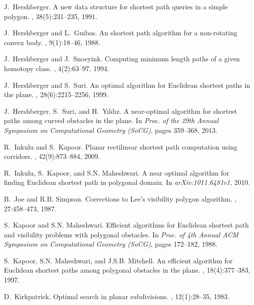 \documentclass[english,runningheads,11pt]{llncs}
\begin{document}
\begin{thebibliography}{10}
J.~Hershberger.
\newblock A new data structure for shortest path queries in a simple polygon.
, 38(5):231--235, 1991.

J.~Hershberger and L.~Guibas.
\newblock An {} shortest path algorithm for a non-rotating convex body.
, 9(1):18--46, 1988.

J.~Hershberger and J.~Snoeyink.
\newblock Computing minimum length paths of a given homotopy class.
, 4(2):63--97,
  1994.

J.~Hershberger and S.~Suri.
\newblock An optimal algorithm for {Euclidean} shortest paths in the plane.
, 28(6):2215--2256, 1999.

J.~Hershberger, S.~Suri, and H.~Y{\i}ld{\i}z.
\newblock A near-optimal algorithm for shortest paths among curved obstacles in
  the plane.
\newblock In {\em Proc. of the 29th Annual Symposium on Computational Geometry
  (SoCG)}, pages 359--368, 2013.

R.~Inkulu and S.~Kapoor.
\newblock Planar rectilinear shortest path computation using corridors.
,
  42(9):873--884, 2009.

R.~Inkulu, S.~Kapoor, and S.N. Maheshwari.
\newblock A near optimal algorithm for finding {Euclidean} shortest path in
  polygonal domain.
\newblock In {\em arXiv:1011.6481v1}, 2010.

B.~Joe and R.B. Simpson.
\newblock Corrections to {Lee's} visibility polygon algorithm.
, 27:458--473, 1987.

S.~Kapoor and S.N. Maheshwari.
\newblock Efficient algorithms for {Euclidean} shortest path and visibility
  problems with polygonal obstacles.
\newblock In {\em Proc. of 4th Annual ACM Symposium on Computational Geometry
  (SoCG)}, pages 172--182, 1988.

S.~Kapoor, S.N. Maheshwari, and J.S.B. Mitchell.
\newblock An efficient algorithm for {Euclidean} shortest paths among polygonal
  obstacles in the plane.
, 18(4):377--383, 1997.

D.~Kirkpatrick.
\newblock Optimal search in planar subdivisions.
, 12(1):28--35, 1983.


\end{thebibliography}
\end{document}
